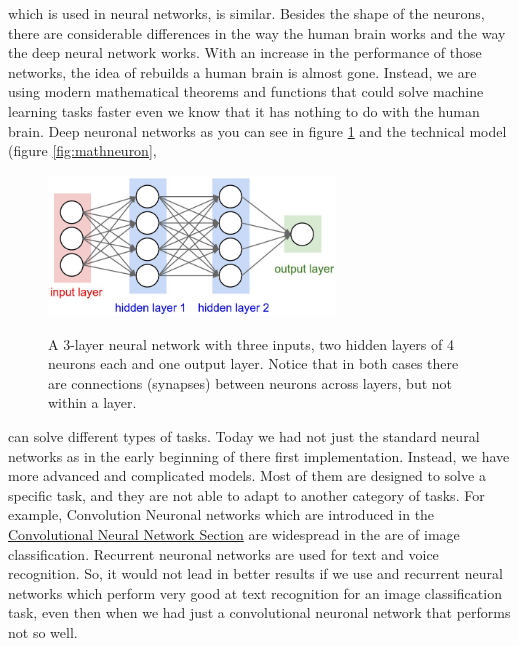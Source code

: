 \documentclass[journal]{IEEEtran}
\begin{document}
which is used in neural networks, is similar. Besides the shape of the neurons, there are considerable differences in the way the human brain works and the way the deep neural network works. With an increase in the performance of those networks, the idea of rebuilds a human brain is almost gone. Instead, we are using modern mathematical theorems and functions that could solve machine learning tasks faster even we know that it has nothing to do with the human brain. Deep neuronal networks as you can see in figure \ref{fig:neural-network}
and the technical model (figure \ref{fig:mathneuron},
\begin{figure}
  \begin{center}
  \includegraphics[width=3in]{photo/neural-network}\\
  \caption{A 3-layer neural network with three inputs, two hidden layers of 4 neurons each and one output layer. Notice that in both cases there are connections (synapses) between neurons across layers, but not within a layer.}
  \label{fig:neural-network}
  \end{center}
\end{figure}
 can solve different types of tasks. Today we had not just the standard neural networks as in the early beginning of there first implementation. Instead, we have more advanced and complicated models. Most of them are designed to solve a specific task, and they are not able to adapt to another category of tasks. For example, Convolution Neuronal networks which are introduced in the \hyperref[subsec:cnn]{Convolutional Neural Network Section} are widespread in the are of image classification. Recurrent neuronal networks are used for text and voice recognition. So, it would not lead in better results if we use and recurrent neural networks which perform very good at text recognition for an image classification task, even then when we had just a convolutional neuronal network that performs not so well.
\end{document}
